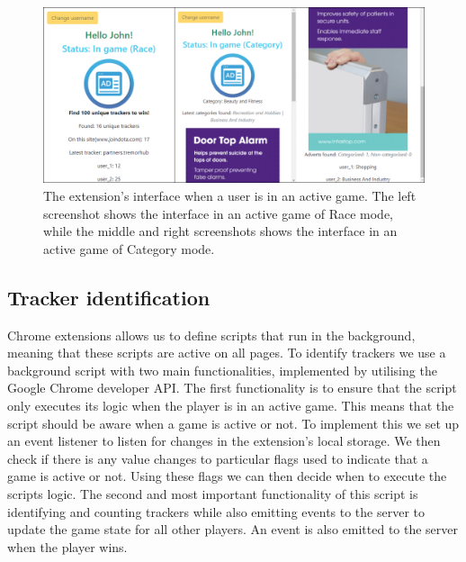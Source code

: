 \documentclass{l4proj}
\begin{document}
\begin{figure}
    \centering
    \includegraphics[width=1\linewidth]{images/ext.png}    

    \caption{The extension's interface when a user is in an active game. The left screenshot shows the interface in an active game of Race mode, while the middle and right screenshots shows the interface in an active game of Category mode.}

    \label{fig:ext} 
\end{figure}




\subsection{Tracker identification}
Chrome extensions allows us to define scripts that run in the background, meaning that these scripts are active on all pages. To identify trackers we use a background script with two main functionalities, implemented by utilising the Google Chrome developer API. The first functionality is to ensure that the script only executes its logic when the player is in an active game. This means that the script should be aware when a game is active or not. To implement this we set up an event listener to listen for changes in the extension's local storage. We then check if there is any value changes to particular flags used to indicate that a game is active or not. Using these flags we can then decide when to execute the scripts logic. The second and most important functionality of this script is identifying and counting trackers while also emitting events to the server to update the game state for all other players. An event is also emitted to the server when the player wins. 
\end{document}
